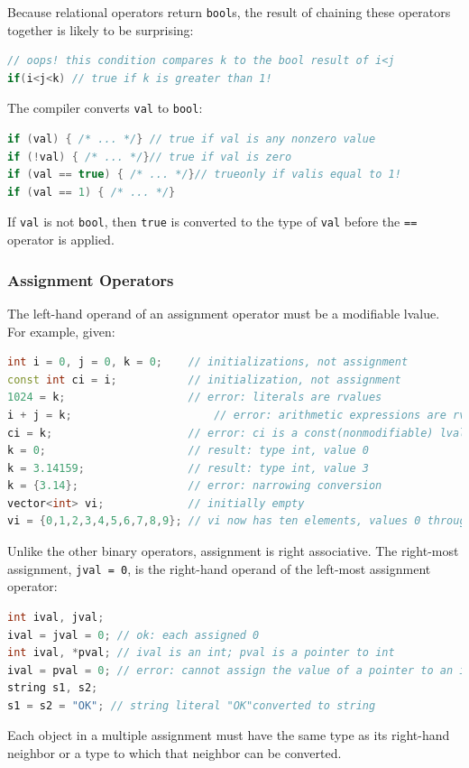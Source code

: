 Because relational operators return \texttt{bool}s, the result of chaining these operators together is likely to be surprising:
\begin{lstlisting}[language=C++]
// oops! this condition compares k to the bool result of i<j 
if(i<j<k) // true if k is greater than 1!
\end{lstlisting}

The compiler converts \texttt{val} to \texttt{bool}:
\begin{lstlisting}[language=C++]
if (val) { /* ... */} // true if val is any nonzero value 
if (!val) { /* ... */}// true if val is zero
if (val == true) { /* ... */}// trueonly if valis equal to 1!
if (val == 1) { /* ... */}
\end{lstlisting}
If \texttt{val} is not \texttt{bool}, then \texttt{true} is converted to the type of \texttt{val} before the \texttt{==} operator is applied. 

\subsubsection{Assignment Operators}

The left-hand operand of an assignment operator must be a modifiable lvalue. For example, given:
\begin{lstlisting}[language=C++]
int i = 0, j = 0, k = 0;    // initializations, not assignment 
const int ci = i;           // initialization, not assignment
1024 = k;                   // error: literals are rvalues 
i + j = k;                      // error: arithmetic expressions are rvalues 
ci = k;                     // error: ci is a const(nonmodifiable) lvalue
k = 0;                      // result: type int, value 0 
k = 3.14159;                // result: type int, value 3
k = {3.14};                 // error: narrowing conversion 
vector<int> vi;             // initially empty 
vi = {0,1,2,3,4,5,6,7,8,9}; // vi now has ten elements, values 0 through 9
\end{lstlisting}

Unlike the other binary operators, assignment is right associative. The right-most assignment, \texttt{jval = 0}, is the right-hand operand of the left-most assignment operator:
\begin{lstlisting}[language=C++]
int ival, jval; 
ival = jval = 0; // ok: each assigned 0
int ival, *pval; // ival is an int; pval is a pointer to int 
ival = pval = 0; // error: cannot assign the value of a pointer to an int 
string s1, s2; 
s1 = s2 = "OK"; // string literal "OK"converted to string
\end{lstlisting}
Each object in a multiple assignment must have the same type as its right-hand neighbor or a type to which that neighbor can be converted.

